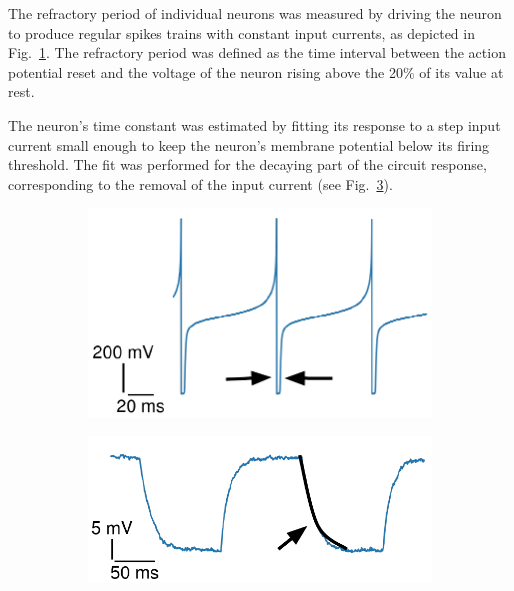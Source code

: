 The refractory period of individual neurons was measured by driving the neuron to produce regular spikes trains with constant input currents, as depicted in Fig.~\ref{fig:neuron_ref}.
The refractory period was defined as the time interval between the action potential reset and the voltage of the neuron rising above the 20\% of its value at rest.

The neuron's time constant was estimated by fitting its response to a step input current small enough to keep the neuron's membrane potential below its firing threshold.
The fit was performed for the decaying part of the circuit response, corresponding to the removal of the input current (see Fig.~\ref{fig:neuron_TC}).

\begin{figure}[h]
  \begin{subfigure}[b]{.3\textwidth}
  \centering
  \includegraphics[width=\textwidth]{img/chapter4/neuron_ref.pdf}
  \subcaption{}
  \label{fig:neuron_ref}
  \end{subfigure}
  \begin{subfigure}[b]{.34\textwidth}
  \centering
  \includegraphics[width=\textwidth]{img/chapter4/neuron_TC.pdf}
  \subcaption{}
  \label{fig:neuron_TC}
  \end{subfigure}

\end{figure}
